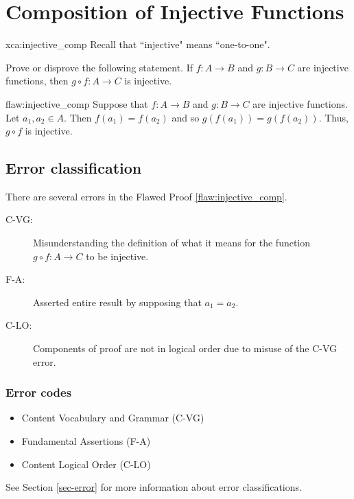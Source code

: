 \section{Composition of Injective Functions}

\begin{xca}{xca:injective_comp}
Recall that ``injective" means ``one-to-one".

\noindent Prove or disprove the following statement. If $f:A \rightarrow B$ and $g:B \rightarrow C$ are injective functions, then $g \circ f : A \rightarrow C$ is injective.
\end{xca}

\begin{flaw}{flaw:injective_comp} 
Suppose that $f:A \rightarrow B$ and $g:B \rightarrow C$ are injective functions. Let $a_1, a_2 \in A$. Then $f(a_1) = f(a_2)$ and so $g(f(a_1)) = g(f(a_2))$. Thus, $g \circ f$ is injective. 
\end{flaw}

\clearpage
\subsection{Error classification}

There are several errors
 in the Flawed Proof \ref{flaw:injective_comp}. 

 
 \begin{description}
 	\item[C-VG:] Misunderstanding the definition of what it means for the function $g\circ f: A \rightarrow C$ to be injective.
 	\item[F-A:] Asserted entire result by supposing that $a_1 = a_2.$ 
 	\item[C-LO:] Components of proof are not in logical order due to misuse of the C-VG error. 
 \end{description}

 
\subsubsection{Error codes}
\begin{itemize}
	\item 	Content Vocabulary and Grammar (C-VG)
	\item   Fundamental Assertions (F-A)
	\item   Content Logical Order (C-LO)
\end{itemize}
See Section \ref{sec-error} for more information about error classifications.

